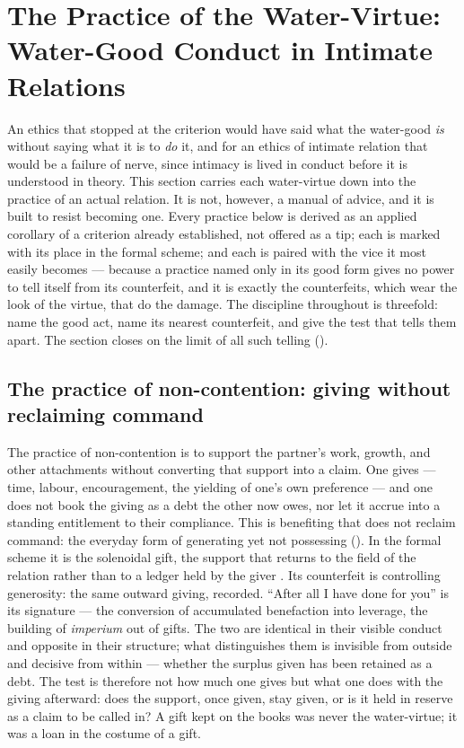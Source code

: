 \section{The Practice of the Water-Virtue: Water-Good Conduct in Intimate Relations}
\label{p20:sec:practice}

\noindent
An ethics that stopped at the criterion would have said what the water-good \emph{is} without saying what it is to \emph{do} it, and for an ethics of intimate relation that would be a failure of nerve, since intimacy is lived in conduct before it is understood in theory. This section carries each water-virtue down into the practice of an actual relation. It is not, however, a manual of advice, and it is built to resist becoming one. Every practice below is derived as an applied corollary of a criterion already established, not offered as a tip; each is marked with its place in the formal scheme; and each is paired with the vice it most easily becomes --- because a practice named only in its good form gives no power to tell itself from its counterfeit, and it is exactly the counterfeits, which wear the look of the virtue, that do the damage. The discipline throughout is threefold: name the good act, name its nearest counterfeit, and give the test that tells them apart. The section closes on the limit of all such telling ().

\subsection{The practice of non-contention: giving without reclaiming command}
\label{p20:sub:practice-buzheng}

The practice of non-contention is to support the partner's work, growth, and other attachments without converting that support into a claim. One gives --- time, labour, encouragement, the yielding of one's own preference --- and one does not book the giving as a debt the other now owes, nor let it accrue into a standing entitlement to their compliance. This is benefiting that does not reclaim command: the everyday form of generating yet not possessing (). In the formal scheme it is the solenoidal gift, the support that returns to the field of the relation rather than to a ledger held by the giver \parencite{wan2026braid}. Its counterfeit is controlling generosity: the same outward giving, recorded. ``After all I have done for you'' is its signature --- the conversion of accumulated benefaction into leverage, the building of \emph{imperium} out of gifts. The two are identical in their visible conduct and opposite in their structure; what distinguishes them is invisible from outside and decisive from within --- whether the surplus given has been retained as a debt. The test is therefore not how much one gives but what one does with the giving afterward: does the support, once given, stay given, or is it held in reserve as a claim to be called in? A gift kept on the books was never the water-virtue; it was a loan in the costume of a gift.

